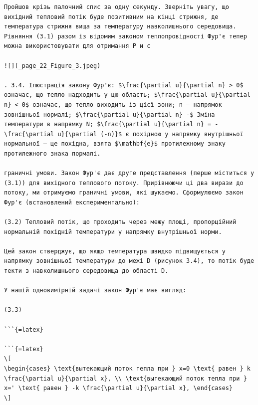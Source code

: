 \documentclass[
]{article}
\begin{document}
\begin{verbatim}
Пройшов крізь палочний спис за одну секунду. Зверніть увагу, що вихідний тепловий потік буде позитивним на кінці стрижня, де температура стрижня вища за температуру навколишнього середовища. Рівняння (3.1) разом із відомим законом теплопровідності Фур'є тепер можна використовувати для отримання Р и с

![](_page_22_Figure_3.jpeg)

. 3.4. Ілюстрація закону Фур'є: $\frac{\partial u}{\partial n} > 0$ означає, що тепло надходить у цю область; $\frac{\partial u}{\partial n} < 0$ означає, що тепло виходить із цієї зони; n — напрямок зовнішньої нормалі; $\frac{\partial u}{\partial n} -$ Зміна температури в напрямку N; $\frac{\partial u}{\partial n} = -\frac{\partial u}{\partial (-n)}$ є похідною у напрямку внутрішньої нормальної — це похідна, взята $\mathbf{e}$ протилежному знаку протилежного знака пормалі.

граничні умови. Закон Фур'є дає друге представлення (перше міститься у (3.1)) для вихідного теплового потоку. Прирівнюючи ці два вирази до потоку, ми отримуємо граничні умови, які шукаємо. Сформулюємо закон Фур'є (встановлений експериментально):

(3.2) Тепловий потік, що проходить через межу площі, пропорційний нормальній похідній температури у напрямку внутрішньої норми.

Цей закон стверджує, що якщо температура швидко підвищується у напрямку зовнішньої температури до межі D (рисунок 3.4), то потік буде текти з навколишнього середовища до області D.

У нашій одновимірній задачі закон Фур'є має вигляд:

(3.3)

```{=latex}

```{=latex}
\[
\begin{cases} \text{вытекающий поток тепла при } x=0 \text{ равен } k \frac{\partial u}{\partial x}, \\ \text{вытекающий поток тепла при } x=' \text{ равен } -k \frac{\partial u}{\partial x}, \end{cases}
\]
\end{verbatim}
\end{document}
